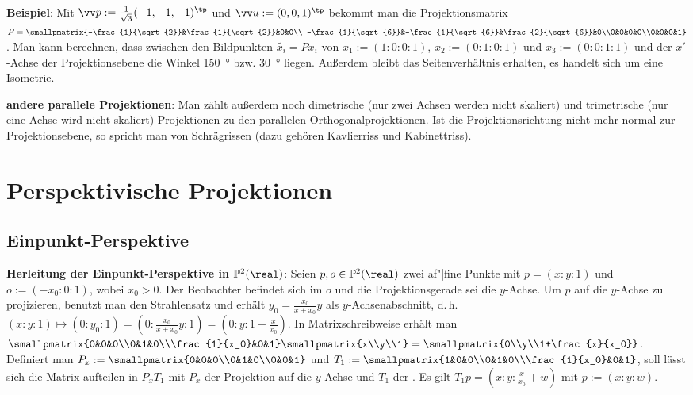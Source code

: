 \vspace{3mm}
\linie

\textbf{Beispiel}:
Mit $\vec{p} := \frac{1}{\sqrt{3}} (-1, -1, -1)^\tp$ und $\vec{u} := (0, 0, 1)^\tp$
bekommt man die Projektionsmatrix
$P = \smallpmatrix{-\frac{1}{\sqrt{2}}&\frac{1}{\sqrt{2}}&0&0\\
-\frac{1}{\sqrt{6}}&-\frac{1}{\sqrt{6}}&\frac{2}{\sqrt{6}}&0\\0&0&0&0\\0&0&0&1}$.
Man kann berechnen, dass zwischen den Bildpunkten $\widetilde{x_i} = Px_i$ von
$x_1 := (1:0:0:1)$, $x_2 := (0:1:0:1)$ und $x_3 := (0:0:1:1)$ und der $x'$-Achse der
Projektionsebene die Winkel \SI{150}{\degree} bzw. \SI{30}{\degree} liegen.
Außerdem bleibt das Seitenverhältnis erhalten, es handelt sich um eine Isometrie.

\textbf{andere parallele Projektionen}:
Man zählt außerdem noch dimetrische (nur zwei Achsen werden nicht skaliert)
und trimetrische (nur eine Achse wird nicht skaliert) Projektionen zu den parallelen
Orthogonalprojektionen.
Ist die Projektionsrichtung nicht mehr normal zur Projektionsebene, so spricht man von
Schrägrissen (dazu gehören Kavlierriss und Kabinettriss).

\pagebreak

\section{%
    Perspektivische Projektionen%
}

\subsection{%
    Einpunkt-Perspektive%
}

\textbf{Herleitung der Einpunkt-Perspektive in $\PP^2(\real)$}:
Seien $p, o \in \PP^2(\real)$ zwei af"|fine Punkte mit $p = (x:y:1)$ und $o := (-x_0:0:1)$,
wobei $x_0 > 0$.
Der Beobachter befindet sich im  $o$ und die Projektionsgerade sei die $y$-Achse.
Um $p$ auf die $y$-Achse zu projizieren, benutzt man den Strahlensatz und erhält
$y_0 = \frac{x_0}{x + x_0} y$ als $y$-Achsenabschnitt, d.\,h.\\
$(x:y:1) \mapsto (0:y_0:1) = (0:\frac{x_0}{x + x_0} y:1) = (0:y:1+\frac{x}{x_0})$.
In Matrixschreibweise erhält man\\
$\smallpmatrix{0&0&0\\0&1&0\\\frac{1}{x_0}&0&1} \smallpmatrix{x\\y\\1} =
\smallpmatrix{0\\y\\1+\frac{x}{x_0}}$.
Definiert man $P_x := \smallpmatrix{0&0&0\\0&1&0\\0&0&1}$ und
$T_1 := \smallpmatrix{1&0&0\\0&1&0\\\frac{1}{x_0}&0&1}$,
soll lässt sich die Matrix aufteilen in $P_x T_1$ mit
$P_x$ der Projektion auf die $y$-Achse und
$T_1$ der .
Es gilt $T_1 p = (x : y : \frac{x}{x_0} + w)$ mit $p := (x:y:w)$.

